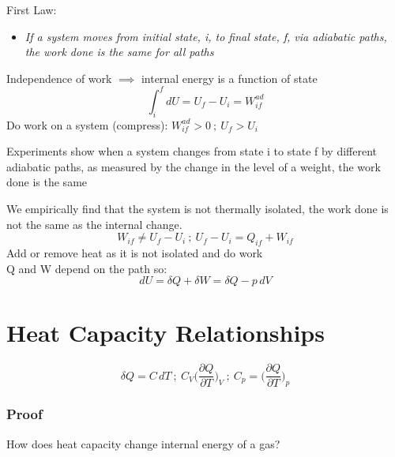 \documentclass[a4paper, 11pt, normalem]{report}
\newcommand\p{\partial}
\begin{document}
First Law:
\begin{itemize}
    \item \emph{If a system moves from initial state, i, to final state, f, via adiabatic paths, the work done is the same for all paths}
\end{itemize}
Independence of work $\implies$ internal energy is a function of state
\begin{equation*}
    \int_{i}^{f} dU = U_f - U_i = W_{if}^{ad}
\end{equation*}
Do work on a system (compress): $W_{if}^{ad} > 0 ~;~ U_f > U_i$

Experiments show when a system changes from state i to state f by different adiabatic paths, as measured by the change in the level of a weight, the work done is the same

We empirically find that the system is not thermally isolated, the work done is not the same as the internal change.
\begin{equation*}
    W_{if} \neq U_f - U_i ~;~ U_f - U_i = Q_{if} + W_{if}
\end{equation*}
Add or remove heat as it is not isolated and do work \\
Q and W depend on the path so:
\begin{equation*}
    dU = \delta Q + \delta W = \delta Q - p\,dV
\end{equation*}

\section{Heat Capacity Relationships}
\begin{equation*}
    \delta Q = C\,dT ~;~ C_{V} \Big(\frac{\p Q}{\p T}\Big)_{V} ~;~ C_{p} = \Big(\frac{\p Q}{\p T} \Big)_{p}
\end{equation*}

\subsubsection{Proof}
How does heat capacity change internal energy of a gas?
\end{document}
